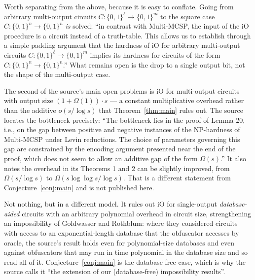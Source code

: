 \documentclass{aicr-conjecture}
\newcommand{\Om}{\Omega}
\newcommand{\bits}{\{0,1\}}
\begin{document}
\begin{remark}\label{rem:padding}
Worth separating from the above, because it is easy to conflate. Going
from arbitrary multi-output circuits $C : \bits^{\ell} \to \bits^{m}$ to
the square case $C : \bits^{n} \to \bits^{n}$ \emph{is} solved: ``in
contrast with Multi-MCSP, the input of the iO procedure is a circuit
instead of a truth-table. This allows us to establish through a simple
padding argument that the hardness of iO for arbitrary multi-output
circuits $C : \bits^{\ell} \to \bits^{m}$ implies its hardness for
circuits of the form $C : \bits^{n} \to \bits^{n}$.'' What remains open is
the drop to a single output bit, not the shape of the multi-output case.
\end{remark}

\begin{remark}\label{rem:neighbour}
The second of the source's main open problems is iO for multi-output
circuits with output size $(1 + \Om(1))\cdot s$ --- a constant
multiplicative overhead rather than the additive $o(s/\log s)$ that
Theorem~\ref{thm:main} rules out. The source locates the bottleneck
precisely: ``The bottleneck lies in the proof of Lemma 20, i.e., on the
gap between positive and negative instances of the NP-hardness of
Multi-MCSP under Levin reductions. The choice of parameters governing
this gap are constrained by the encoding argument presented near the end
of the proof, which does not seem to allow an additive gap of the form
$\Om(s)$.'' It also notes the overhead in its Theorems 1 and 2 can be
slightly improved, from $\Om(s/\log s)$ to $\Om(s\log\log s/\log s)$.
That is a different statement from Conjecture~\ref{conj:main} and is not
published here.
\end{remark}

\begin{remark}\label{rem:database}
Not nothing, but in a different model. It rules out iO for single-output
\emph{database-aided} circuits with an arbitrary polynomial overhead in
circuit size, strengthening an impossibility of Goldwasser and Rothblum:
where they considered circuits with access to an exponential-length
database that the obfuscator accesses by oracle, the source's result
holds even for polynomial-size databases and even against obfuscators
that may run in time polynomial in the database size and so read all of
it. Conjecture~\ref{conj:main} is the database-free case, which is why
the source calls it ``the extension of our (database-free) impossibility
results''.
\end{remark}
\end{document}
